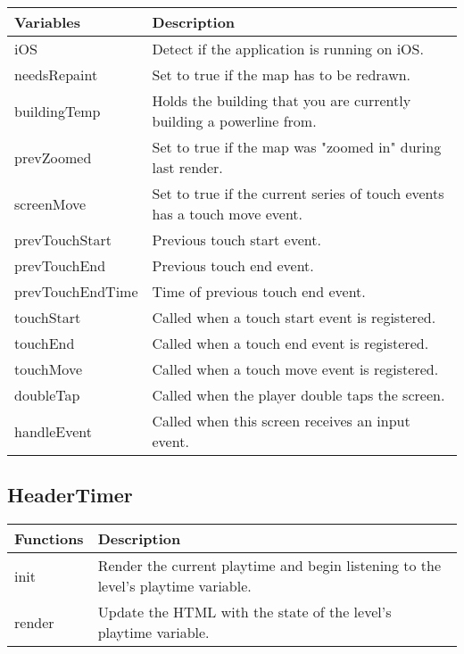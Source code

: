 	\begin{table}[H]
	\begin{tabular}{p{4cm} | p{8cm} }
	\hline
	\rowcolor{gray}
	Variables & Description \\ \hline
	iOS & Detect if the application is running on iOS. \\ \hline
	needsRepaint & Set to true if the map has to be redrawn. \\ \hline
	buildingTemp & Holds the building that you are currently building a powerline from. \\ \hline
	prevZoomed & Set to true if the map was "zoomed in" during last render. \\ \hline
  	screenMove & Set to true if the current series of touch events has a touch move event. \\ \hline
  	prevTouchStart & Previous touch start event. \\ \hline
 	prevTouchEnd & Previous touch end event. \\ \hline
  	prevTouchEndTime & Time of previous touch end event. \\ \hline
  	touchStart & Called when a touch start event is registered. \\ \hline
  	touchEnd & Called when a touch end event is registered. \\ \hline
  	touchMove & Called when a touch move event is registered. \\ \hline
  	doubleTap & Called when the player double taps the screen. \\ \hline
  	handleEvent & Called when this screen receives an input event. \\ \hline
	\end{tabular}
	\end{table}

\subsection*{HeaderTimer}

	\begin{table}[H]
	\begin{tabular}{p{4cm} | p{8cm} }
	\hline
	\rowcolor{gray}
	Functions & Description \\ \hline
	init & Render the current playtime and begin listening to the level's playtime variable. \\ \hline
	render & Update the HTML with the state of the level's playtime variable. \\ \hline
	\end{tabular}
	\end{table}

